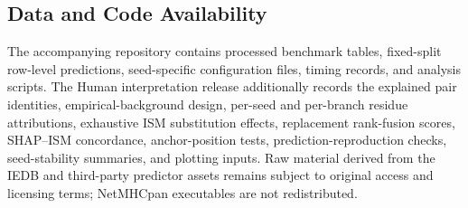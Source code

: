 \subsection{Data and Code Availability}

The accompanying repository contains processed benchmark tables, fixed-split row-level predictions, seed-specific configuration files, timing records, and analysis scripts. The Human interpretation release additionally records the explained pair identities, empirical-background design, per-seed and per-branch residue attributions, exhaustive ISM substitution effects, replacement rank-fusion scores, SHAP--ISM concordance, anchor-position tests, prediction-reproduction checks, seed-stability summaries, and plotting inputs. Raw material derived from the IEDB and third-party predictor assets remains subject to original access and licensing terms; NetMHCpan executables are not redistributed.
